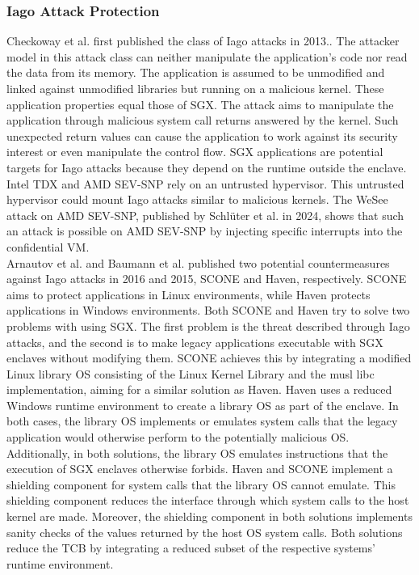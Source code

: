 \subsubsection{Iago Attack Protection}
\label{sec:20:iago}
Checkoway et al. first published the class of Iago attacks in
2013.\cite{checkoway2013iago}. The attacker model in this attack class can
neither manipulate the application's code nor read the data from its memory. The
application is assumed to be unmodified and linked against unmodified libraries
but running on a malicious kernel. These application properties equal those of
SGX. The attack aims to manipulate the application through malicious system call
returns answered by the kernel. Such unexpected return values can cause the
application to work against its security interest or even manipulate the control
flow. SGX applications are potential targets for Iago attacks because they
depend on the runtime outside the enclave. Intel TDX and AMD SEV-SNP rely on an
untrusted hypervisor.\cite{tdx_whitepaper,kaplan_amd_2020} This untrusted
hypervisor could mount Iago attacks similar to malicious kernels. The WeSee
attack on AMD SEV-SNP, published by Schlüter et al. in 2024, shows that such an
attack is possible on AMD SEV-SNP by injecting specific interrupts into the
confidential VM.\cite{schluter2024wesee}\\

Arnautov et al. and Baumann et al. published two potential countermeasures
against Iago attacks in 2016 and 2015, SCONE and Haven, respectively. SCONE aims
to protect applications in Linux environments, while Haven protects applications
in Windows environments.\cite{arnautov_scone_2016, baumann_shielding_2015} Both
SCONE and Haven try to solve two problems with using SGX. The first problem is
the threat described through Iago attacks, and the second is to make legacy
applications executable with SGX enclaves without modifying them. SCONE achieves
this by integrating a modified Linux library OS consisting of the Linux Kernel
Library and the musl libc implementation, aiming for a similar solution as
Haven. Haven uses a reduced Windows runtime environment to create a library OS
as part of the enclave. In both cases, the library OS implements or emulates
system calls that the legacy application would otherwise perform to the
potentially malicious OS. Additionally, in both solutions, the library OS
emulates instructions that the execution of SGX enclaves otherwise forbids.
Haven and SCONE implement a shielding component for system calls that the
library OS cannot emulate. This shielding component reduces the interface
through which system calls to the host kernel are made. Moreover, the shielding
component in both solutions implements sanity checks of the values returned by
the host OS system calls. Both solutions reduce the TCB by integrating a reduced
subset of the respective systems' runtime environment.


